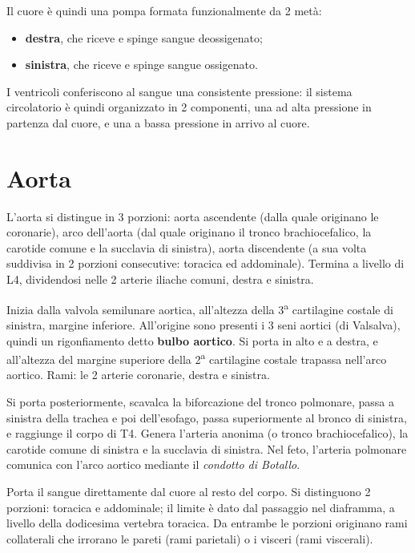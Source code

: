 Il cuore è quindi una pompa formata funzionalmente da 2 metà:
\begin{itemize}
  \item \textbf{destra}, che riceve e spinge sangue deossigenato;
  \item \textbf{sinistra}, che riceve e spinge sangue ossigenato.
\end{itemize}

I ventricoli conferiscono al sangue una consistente pressione: il sistema circolatorio è quindi
organizzato in 2 componenti, una ad alta pressione in partenza dal cuore, e una a bassa pressione
in arrivo al cuore.

\section{Aorta}

L'aorta si distingue in 3 porzioni: aorta ascendente (dalla quale originano le coronarie), arco
dell'aorta (dal quale originano il tronco brachiocefalico, la carotide comune e la succlavia di
sinistra), aorta discendente (a sua volta suddivisa in 2 porzioni consecutive: toracica ed
addominale). Termina a livello di L4, dividendosi nelle 2 arterie iliache comuni, destra e
sinistra.

Inizia dalla valvola semilunare aortica, all'altezza della 3\textsuperscript{a} cartilagine
costale di sinistra, margine inferiore. All'origine sono presenti i 3 seni aortici (di Valsalva),
quindi un rigonfiamento detto \textbf{bulbo aortico}. Si porta in alto e a destra, e all'altezza
del margine superiore della 2\textsuperscript{a} cartilagine costale trapassa nell'arco aortico.
Rami: le 2 arterie coronarie, destra e sinistra.

Si porta posteriormente, scavalca la biforcazione del tronco polmonare, passa a sinistra della
trachea e poi dell'esofago, passa superiormente al bronco di sinistra, e raggiunge il corpo di
T4. Genera l'arteria anonima (o tronco brachiocefalico), la carotide comune di sinistra e la
succlavia di sinistra. Nel feto, l'arteria polmonare comunica con l'arco aortico mediante il
\textit{condotto di Botallo}.

Porta il sangue direttamente dal cuore al resto del corpo. Si distinguono 2 porzioni: toracica e
addominale; il limite è dato dal passaggio nel diaframma, a livello della dodicesima vertebra
toracica. Da entrambe le porzioni originano rami collaterali che irrorano le pareti (rami
parietali) o i visceri (rami viscerali).

